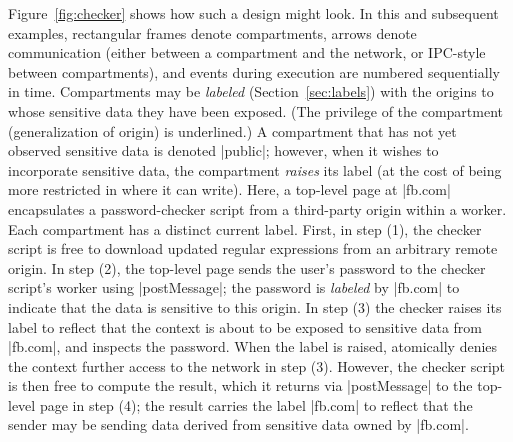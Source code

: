 Figure~\ref{fig:checker} shows how such a design might look. In this
and subsequent examples, rectangular frames denote compartments,
arrows denote communication (either between a compartment and the network,
or IPC-style between compartments), and events during execution are
numbered sequentially in time. Compartments may be \emph{labeled} (Section~\ref{sec:labels}) with the
origins to whose sensitive data they have been exposed. (The privilege
of the compartment (generalization of origin) is underlined.) A compartment that
has not yet observed sensitive data is denoted \js|public|; however, when it
wishes to incorporate sensitive data, the compartment \emph{raises} its
label (at the cost of being more restricted in where it can write). Here, a top-level page at
\js|fb.com| encapsulates a password-checker script from a third-party
origin within a worker. Each compartment has a
distinct current label. First, in step (1), the checker script is free
to download updated regular expressions from an arbitrary remote
origin. In step (2), the top-level page sends the user's password to
the checker script's worker using \js|postMessage|; the password is
\emph{labeled} by \js|fb.com| to indicate that the data is sensitive
to this origin.
%
%
In step (3) the checker raises its label to reflect that the context
is about to be exposed to sensitive data from \js|fb.com|, and
inspects the password.
%
When the label is raised, \sys{} atomically denies the context further
access to the network in step (3).
%
However, the checker script is then free to compute the result, which
it returns via \js|postMessage| to the top-level page in step (4); the
result carries the label \js|fb.com| to reflect that the sender may be
sending data derived from sensitive data owned by \js|fb.com|.

